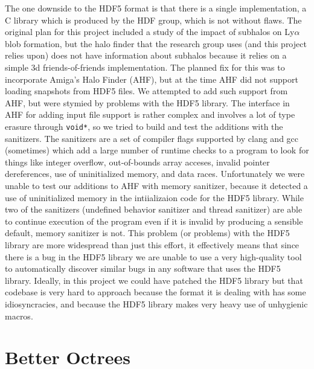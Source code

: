 The one downside to the HDF5 format is that there is a single implementation, a C library which is produced by the HDF group, which is not without flaws. 
The original plan for this project included a study of the impact of subhalos on Ly$\alpha$ blob formation, but the halo finder that the research group uses (and this project relies upon) does not have information about subhalos because it relies on a simple 3d friends-of-friends implementation.
The planned fix for this was to incorporate Amiga's Halo Finder (AHF), but at the time AHF did not support loading snapshots from HDF5 files.
We attempted to add such support from AHF, but were stymied by problems with the HDF5 library.
The interface in AHF for adding input file support is rather complex and involves a lot of type erasure through \lstinline{void*}, so we tried to build and test the additions with the sanitizers.
The sanitizers are a set of compiler flags supported by clang and gcc (sometimes) which add a large number of runtime checks to a program to look for things like integer overflow, out-of-bounds array acceses, invalid pointer dereferences, use of uninitialized memory, and data races.
Unfortunately we were unable to test our additions to AHF with memory sanitizer, because it detected a use of uninitialized memory in the intiializaion code for the HDF5 library.
While two of the sanitizers (undefined behavior sanitizer and thread sanitizer) are able to continue execution of the program even if it is invalid by producing a sensible default, memory sanitizer is not.
This problem (or problems) with the HDF5 library are more widespread than just this effort, it effectively means that since there is a bug in the HDF5 library we are unable to use a very high-quality tool to automatically discover similar bugs in any software that uses the HDF5 library.
Ideally, in this project we could have patched the HDF5 library but that codebase is very hard to approach because the format it is dealing with has some idiosyncracies, and because the HDF5 library makes very heavy use of unhygienic macros.

\section{Better Octrees}

